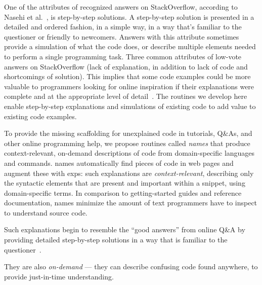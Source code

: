 \begin{changes}
One of the attributes of recognized answers on StackOverflow, according to Nasehi et al.~\cite{nasehi_what_2012}, is step-by-step solutions.
A step-by-step solution is presented in a detailed and ordered fashion, in a simple way, in a way that's familiar to the questioner or friendly to newcomers.
Answers with this attribute sometimes provide a simulation of what the code does, or describe multiple elements needed to perform a single programming task. 
Three common attributes of low-vote answers on StackOverflow (lack of explanation, in addition to lack of code and shortcomings of solution).
This implies that some code examples could be more valuable to programmers looking for online inspiration if their explanations were complete and at the appropriate level of detail~\cite{nasehi_what_2012}.
\fi
The routines we develop here enable step-by-step explanations and simulations of existing code to add value to existing code examples.
\end{changes}
\fi

To provide the missing scaffolding for unexplained code in tutorials, Q\&As, and other online programming help, we propose routines called \emph{\Glspl{name}} that produce context-relevant, on-demand descriptions of code from domain-specific languages and commands.
\Glspl{name} automatically find pieces of code in web pages and augment these with \glspl{exp}: such explanations are \emph{context-relevant}, describing only the syntactic elements that are present and important within a snippet, using domain-specific terms.
In comparison to getting-started guides and reference documentation, \Glspl{name} minimize the amount of text programmers have to inspect to understand source code.
\begin{changes}
Such explanations begin to resemble the ``good answers'' from online Q\&A by providing detailed step-by-step solutions in a way that is familiar to the questioner~\cite{nasehi_what_2012}.
\end{changes}
\fi
They are also \emph{on-demand} --- they can describe confusing code found anywhere, to provide just-in-time understanding.

